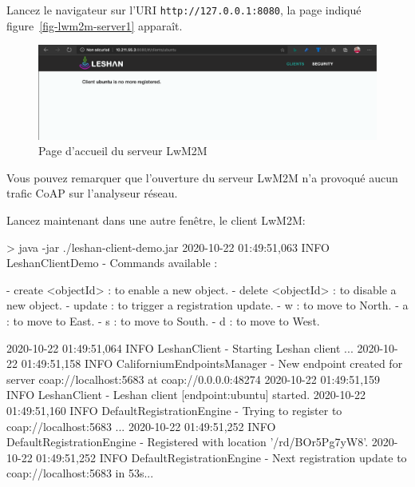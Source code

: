          \vspace{1em}

Lancez le navigateur sur l'URI \texttt{http://127.0.0.1:8080}, la page indiqué figure~\vref{fig-lwm2m-server1} apparaît.

\begin{figure}[tbp]
\centerline{\includegraphics[width=1\columnwidth]{Pictures/lwm2m-server1.png}}
\caption{Page d'accueil du serveur LwM2M}
\label{fig-lwm2m-server1}
\end{figure}

Vous pouvez remarquer que l'ouverture du serveur LwM2M n'a provoqué aucun trafic CoAP sur l'analyseur réseau.

         \vspace{1em}

Lancez maintenant dans une autre fenêtre, le client LwM2M:

\begin{termc}[backgroundcolor=\color{purple!30}, basicstyle=\ttfamily\small, escapechar=@] %
> java -jar ./leshan-client-demo.jar
2020-10-22 01:49:51,063 INFO LeshanClientDemo - Commands available :

  - create <objectId> : to enable a new object.
  - delete <objectId> : to disable a new object.
  - update : to trigger a registration update.
  - w : to move to North.
  - a : to move to East.
  - s : to move to South.
  - d : to move to West.

2020-10-22 01:49:51,064 INFO LeshanClient - Starting Leshan client ...
2020-10-22 01:49:51,158 INFO CaliforniumEndpointsManager - New 
endpoint created for server coap://localhost:5683 at 
coap://0.0.0.0:48274
2020-10-22 01:49:51,159 INFO LeshanClient - Leshan client
[endpoint:ubuntu] started.
2020-10-22 01:49:51,160 INFO DefaultRegistrationEngine - Trying to 
register to coap://localhost:5683 ...
2020-10-22 01:49:51,252 INFO DefaultRegistrationEngine - Registered 
with location '/rd/BOr5Pg7yW8'.
2020-10-22 01:49:51,252 INFO DefaultRegistrationEngine - Next 
registration update to coap://localhost:5683 in 53s...
\end{termc}

